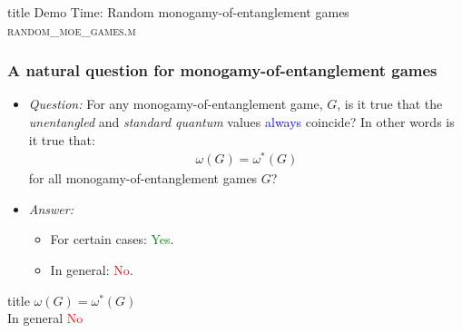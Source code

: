 \documentclass{beamer}
\begin{document}
\begin{frame} [noframenumbering]
  \vfill
  \centering
  \begin{beamercolorbox}[sep=8pt,center,shadow=true,rounded=true]{title}
    Demo Time: Random monogamy-of-entanglement games \\ \textsc{random\_moe\_games.m}
  \end{beamercolorbox}
  \vfill
\end{frame}

\begin{frame}
	\frametitle{A natural question for monogamy-of-entanglement games}
\begin{itemize}
\item \emph{Question:} For any monogamy-of-entanglement game, $G$, is it true that the \emph{unentangled} and \emph{standard quantum} values \textcolor{blue}{always} coincide? In other words is it true that:
	\begin{align*}
		\omega(G) = \omega^*(G)
	\end{align*}
for all monogamy-of-entanglement games $G$?

\vspace{5mm}
\item \emph{Answer:}
	\begin{itemize}
		\item For certain cases: \textcolor{green}{Yes}.
		\item In general: \textcolor{red}{No}.
	\end{itemize}

\end{itemize}
\end{frame}

\begin{frame}[noframenumbering]
  \vfill
  \centering
  \begin{beamercolorbox}[sep=8pt,center,shadow=true,rounded=true]{title}
     $\omega(G) = \omega^*(G)$ \\ In general \textcolor{red}{No}
  \end{beamercolorbox}
  \vfill
  \end{frame}
\end{document}
